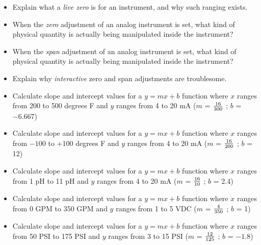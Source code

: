 \begin{itemize}
\item{} Explain what a {\it live zero} is for an instrument, and why such ranging exists.
\item{} When the {\it zero} adjustment of an analog instrument is set, what kind of physical quantity is actually being manipulated inside the instrument?
\item{} When the {\it span} adjustment of an analog instrument is set, what kind of physical quantity is actually being manipulated inside the instrument?
\item{} Explain why {\it interactive} zero and span adjustments are troublesome.
\item{} Calculate slope and intercept values for a $y = mx + b$ function where $x$ ranges from 200 to 500 degrees F and $y$ ranges from 4 to 20 mA ($m$ = $16 \over 300$ ; $b$ = $-6.667$) 
\item{} Calculate slope and intercept values for a $y = mx + b$ function where $x$ ranges from $-100$ to +100 degrees F and $y$ ranges from 4 to 20 mA ($m$ = $16 \over 200$ ; $b$ = 12) 
\item{} Calculate slope and intercept values for a $y = mx + b$ function where $x$ ranges from 1 pH to 11 pH and $y$ ranges from 4 to 20 mA ($m$ = $16 \over 10$ ; $b$ = 2.4) 
\item{} Calculate slope and intercept values for a $y = mx + b$ function where $x$ ranges from 0 GPM to 350 GPM and $y$ ranges from 1 to 5 VDC ($m$ = $4 \over 350$ ; $b$ = 1) 
\item{} Calculate slope and intercept values for a $y = mx + b$ function where $x$ ranges from 50 PSI to 175 PSI and $y$ ranges from 3 to 15 PSI ($m$ = $12 \over 125$ ; $b$ = $-1.8$) 
\end{itemize}




